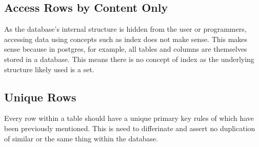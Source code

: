 \documentclass[letterpaper, 10pt]{article}
\begin{document}
\subsection{Access Rows by Content Only}
As the database's internal structure is hidden from the user or programmers,
   accessing data using concepts such as index does not make sense.
This makes sense because in postgres, for example, all tables and columns are 
   themselves stored in a database.
This means there is no concept of index as the underlying structure likely used is a set.

\subsection{Unique Rows}
Every row within a table should have a unique primary key rules of 
   which have been previously mentioned.
This is need to differinate and assert no duplication of similar or the same 
   thing within the database.
\end{document}
